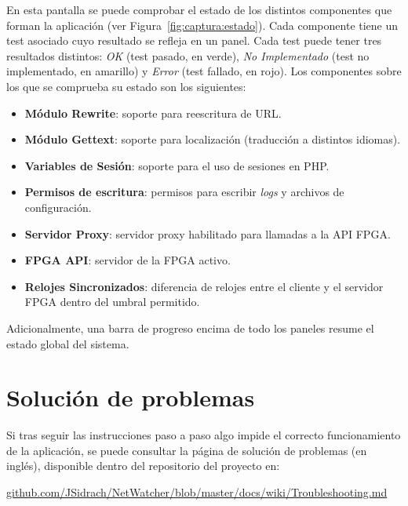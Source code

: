 En esta pantalla se puede comprobar el estado de los distintos componentes que forman la aplicación (ver Figura~\ref{fig:captura:estado}).
Cada componente tiene un test asociado cuyo resultado se refleja en un panel.
Cada test puede tener tres resultados distintos: \textit{OK} (test pasado, en verde), \textit{No Implementado} (test no implementado, en amarillo) y \textit{Error} (test fallado, en rojo).
Los componentes sobre los que se comprueba su estado son los siguientes:
\begin{itemize}
  \item \textbf{Módulo Rewrite}: soporte para reescritura de \gls{URL}.
  \item \textbf{Módulo Gettext}: soporte para localización (traducción a distintos idiomas).
  \item \textbf{Variables de Sesión}: soporte para el uso de sesiones en \gls{PHP}.
  \item \textbf{Permisos de escritura}: permisos para escribir \textit{logs} y archivos de configuración.
  \item \textbf{Servidor Proxy}: servidor proxy habilitado para llamadas a la API \gls{FPGA}.
  \item \textbf{\gls{FPGA} API}: servidor de la \gls{FPGA} activo.
  \item \textbf{Relojes Sincronizados}: diferencia de relojes entre el cliente y el servidor \gls{FPGA} dentro del umbral permitido.
\end{itemize}

Adicionalmente, una barra de progreso encima de todo los paneles resume el estado global del sistema.


\section{Solución de problemas\label{extra:manual:solucion}}

Si tras seguir las instrucciones paso a paso algo impide el correcto funcionamiento de la aplicación, se puede consultar la página de solución de problemas (en inglés), disponible dentro del repositorio del proyecto en:

\href{https://github.com/JSidrach/NetWatcher/blob/master/docs/wiki/Troubleshooting.md}{github.com/JSidrach/NetWatcher/blob/master/docs/wiki/Troubleshooting.md}
